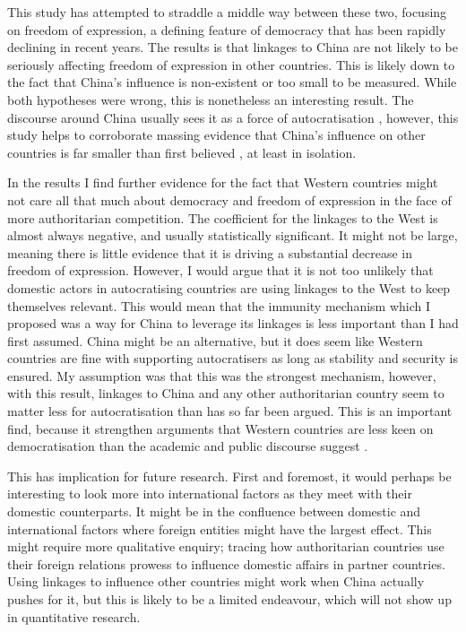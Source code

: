 This study has attempted to straddle a middle way between these two, focusing on freedom of expression, a defining feature of democracy that has been rapidly declining in recent years. The results is that linkages to China are not likely to be seriously affecting freedom of expression in other countries. This is likely down to the fact that China's influence is non-existent or too small to be measured. While both hypotheses were wrong, this is nonetheless an interesting result. The discourse around China usually sees it as a force of autocratisation \citep{jintao_chinas_2023, biden_remarks_2021, economy_exporting_2020, repucci_authoritarians_2022}, however, this study helps to corroborate massing evidence that China's influence on other countries is far smaller than first believed \citep{saba_promoting_2025, borzel_noble_2015, risse_democracy_2015, hackenesch_not_2015}, at least in isolation.

In the results I find further evidence for the fact that Western countries might not care all that much about democracy and freedom of expression in the face of more authoritarian competition. The coefficient for the linkages to the West is almost always negative, and usually statistically significant. It might not be large, meaning there is little evidence that it is driving a substantial decrease in freedom of expression. However, I would argue that it is not too unlikely that domestic actors in autocratising countries are using linkages to the West to keep themselves relevant. This would mean that the immunity mechanism which I proposed was a way for China to leverage its linkages is less important than I had first assumed. China might be an alternative, but it does seem like Western countries are fine with supporting autocratisers as long as stability and security is ensured. My assumption was that this was the strongest mechanism, however, with this result, linkages to China and any other authoritarian country seem to matter less for autocratisation than has so far been argued. This is an important find, because it strengthen arguments that Western countries are less keen on democratisation than the academic and public discourse suggest \citep{borzel_noble_2015, delcour_spoiler_2015, freyburg_local_2015, risse_democracy_2015}.

This has implication for future research. First and foremost, it would perhaps be interesting to look more into international factors as they meet with their domestic counterparts. It might be in the confluence between domestic and international factors where foreign entities might have the largest effect. This might require more qualitative enquiry; tracing how authoritarian countries use their foreign relations prowess to influence domestic affairs in partner countries. Using linkages to influence other countries might work when China actually pushes for it, but this is likely to be a limited endeavour, which will not show up in quantitative research. 

